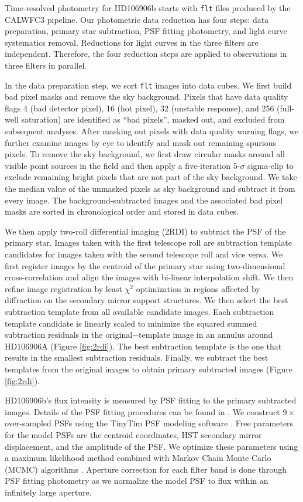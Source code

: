 \documentclass[twocolumn]{aastex62}
\begin{document}
Time-resolved photometry for HD106906b starts with \texttt{flt} files produced by the CALWFC3 pipeline. Our photometric data reduction has four steps: data preparation, primary star subtraction, PSF fitting photometry, and light curve systematics removal. Reductions for light curves in the three filters are independent. Therefore, the four reduction steps are applied to observations in three filters in parallel. 

In the data preparation step, we sort \texttt{flt} images into data cubes. We first build bad pixel masks and remove the sky background. Pixels that have data quality flags 4 (bad detector pixel), 16 (hot pixel), 32 (unstable response), and 256 (full-well saturation) are identified as ``bad pixels'', masked out, and excluded from subsequent analyses. After masking out pixels with data quality warning flags, we further examine images by eye to identify and mask out remaining spurious pixels. To remove the sky background, we first draw circular masks around all visible point sources in the field and then apply a five-iteration $5\mbox{-}\sigma$ sigma-clip to exclude remaining bright pixels that are not part of the sky background. We take the median value of the unmasked pixels as sky background and subtract it from every image. The background-subtracted images and the associated bad pixel masks are sorted in chronological order and stored in data cubes.

We then apply two-roll differential imaging (2RDI) to subtract the PSF of the primary star.  Images taken with the first telescope roll are subtraction template candidates for images taken with the second telescope roll and vice versa. We first register images by the centroid of the primary star using two-dimensional cross-correlation and align the images with bi-linear interpolation shift. We then  refine image registration by least $\chi^{2}$ optimization in regions affected by diffraction on the secondary mirror support structures. We then select the best subtraction template from all available candidate images.  Each subtraction template candidate is linearly scaled to minimize the squared summed subtraction residuals in the original$-$template image in an annulus around HD106906A (Figure \ref{fig:2rdi}). The best subtraction template is the one that results in the smallest subtraction residuals. Finally, we subtract the best templates from the original images to obtain primary subtracted images (Figure \ref{fig:2rdi}). 

HD106906b's flux intensity is measured by PSF fitting to the primary subtracted images. Details of the PSF fitting procedures can be found in \citet{Zhou2019}. We construct $9\times$ over-sampled PSFs using the TinyTim PSF modeling software \citep{Krist1995}. Free parameters for the model PSFs are the centroid coordinates, HST secondary mirror displacement, and the amplitude of the PSF. We optimize these parameters using a maximum likelihood method combined with Markov Chain Monte Carlo (MCMC) algorithms \citep[MCMC performed by \texttt{emcee},][]{Foreman-Mackey2012}. Aperture correction for each filter band is done through PSF fitting photometry as we normalize the model PSF to flux within an infinitely large aperture. 
\end{document}

